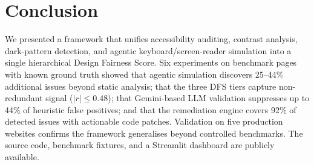\documentclass[runningheads]{llncs}
\begin{document}
\section{Conclusion}

We presented a framework that unifies accessibility auditing, contrast analysis, dark-pattern detection, and agentic keyboard/screen-reader simulation into a single hierarchical Design Fairness Score. Six experiments on benchmark pages with known ground truth showed that agentic simulation discovers 25--44\% additional issues beyond static analysis; that the three DFS tiers capture non-redundant signal ($|r| \leq 0.48$); that Gemini-based LLM validation suppresses up to 44\% of heuristic false positives; and that the remediation engine covers 92\% of detected issues with actionable code patches. Validation on five production websites confirms the framework generalises beyond controlled benchmarks. The source code, benchmark fixtures, and a Streamlit dashboard are publicly available.


\end{document}

